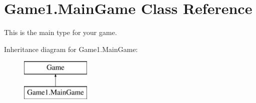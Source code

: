 \hypertarget{class_game1_1_1_main_game}{}\section{Game1.\+Main\+Game Class Reference}
\label{class_game1_1_1_main_game}


This is the main type for your game.  


Inheritance diagram for Game1.\+Main\+Game\+:\begin{figure}[H]
\begin{center}
\leavevmode
\includegraphics[height=2.000000cm]{class_game1_1_1_main_game}
\end{center}
\end{figure}
